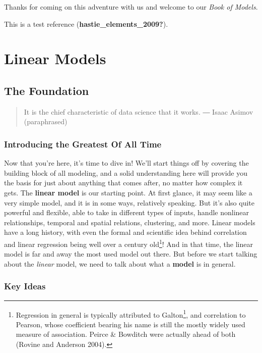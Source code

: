 \documentclass[
  letterpaper,
]{krantz}
\DeclareRobustCommand{\href}[2]{#2\footnote{\url{#1}}}
\begin{document}
Thanks for coming on this adventure with us and welcome to our
\emph{Book of Models}.

This is a test reference (\textbf{hastie\_elements\_2009?}).

\part{Linear Models}

\chapter{The Foundation}\label{sec-foundation}

\begin{quote}
It is the chief characteristic of data science that it works. ― Isaac
Asimov (paraphrased)
\end{quote}

\section{Introducing the Greatest Of All Time}\label{sec-goat}

Now that you're here, it's time to dive in! We'll start things off by
covering the building block of all modeling, and a solid understanding
here will provide you the basis for just about anything that comes
after, no matter how complex it gets. The \textbf{linear model} is our
starting point. At first glance, it may seem like a very simple model,
and it is in some ways, relatively speaking. But it's also quite
powerful and flexible, able to take in different types of inputs, handle
nonlinear relationships, temporal and spatial relations, clustering, and
more. Linear models have a long history, with even the formal and
scientific idea behind correlation and linear regression being well over
a century old\footnote{Regression in general is typically attributed to
  \href{https://en.wikipedia.org/wiki/Francis_Galton}{Galton}, and
  correlation to Pearson, whose coefficient bearing his name is still
  the mostly widely used measure of association. Peirce \& Bowditch were
  actually ahead of both (Rovine and Anderson 2004).}! And in that time,
the linear model is far and away the most used model out there. But
before we start talking about the \emph{linear} model, we need to talk
about what a \textbf{model} is in general.

\section{Key Ideas}\label{sec-lm-key-ideas}
\end{document}
